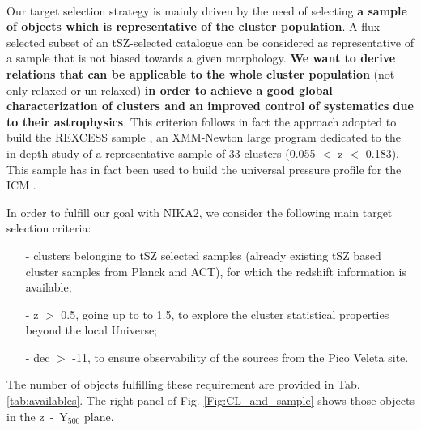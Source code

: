 \documentclass[11pt,a4paper,twoside,graphicx,color]{article}
\begin{document}
\vspace{0.3cm}  \\
Our target selection strategy is mainly driven by the need of selecting {\bf a sample of objects which is representative of the cluster population}.
A flux selected subset of an tSZ-selected catalogue can be considered as representative of a sample that is not biased towards a given morphology.  {\bf We want to derive relations that can be applicable to the whole cluster population} (not only relaxed or un-relaxed) {\bf in order to achieve a good global characterization of clusters and an improved control of systematics due to their astrophysics}.
This criterion follows in fact the approach adopted to build the REXCESS sample \citep{REXCESS}, an XMM-Newton large program dedicated to the in-depth study of a representative sample of 33 clusters (0.055 $<$ z $<$ 0.183). This sample has in fact been used to build the universal pressure profile for the ICM \citep[][ an average profile for the cluster population, derived from observations, scaled by mass and redshift according to the standard self-similar model]{Arnaud2010}. 

In order to fulfill our goal with NIKA2, we consider the following main target selection criteria:
\begin{itemize}
  \item [-] clusters belonging to tSZ selected samples (already existing tSZ based cluster samples from Planck and ACT), for which the redshift information is available;
  \item [-] z $>$ 0.5, going up to to 1.5, to explore the cluster statistical properties beyond the local Universe;
  \item [-] dec $>$ -11, to ensure observability of the sources from the Pico Veleta site.
\end{itemize}

The number of objects fulfilling these requirement are provided in Tab. \ref{tab:availables}. 
The right panel of Fig. \ref{Fig:CL_and_sample} shows those objects in the z~-~Y$_{500}$ plane.
\end{document}
